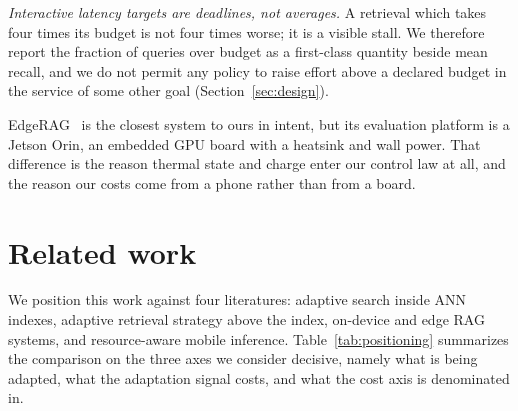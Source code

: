 \documentclass[journal]{IEEEtran}
\begin{document}
\emph{Interactive latency targets are deadlines, not averages.} A retrieval
which takes four times its budget is not four times worse; it is a visible
stall. We therefore report the fraction of queries over budget as a
first-class quantity beside mean recall, and we do not permit any policy to
raise effort above a declared budget in the service of some other goal
(Section~\ref{sec:design}).

EdgeRAG~\cite{seemakhupt2024edgerag} is the closest system to ours in
intent, but its evaluation platform is a Jetson Orin, an embedded GPU board
with a heatsink and wall power. That difference is the reason thermal state
and charge enter our control law at all, and the reason our costs come from
a phone rather than from a board.

\section{Related work}
\label{sec:related}

We position this work against four literatures: adaptive search inside ANN
indexes, adaptive retrieval strategy above the index, on-device and edge
RAG systems, and resource-aware mobile inference.
Table~\ref{tab:positioning} summarizes the comparison on the three axes we
consider decisive, namely what is being adapted, what the adaptation signal
costs, and what the cost axis is denominated in.
\end{document}
